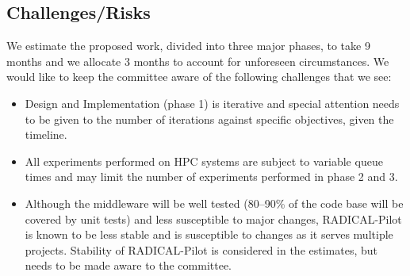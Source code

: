 \subsection{Challenges/Risks}

We estimate the proposed work, divided into three major phases, to take 9 months 
and we allocate 3 months to account for unforeseen circumstances. We would like 
to keep the committee aware of the following challenges that we see:

\begin{itemize}
	\item Design and Implementation (phase 1) is iterative and special attention needs to be given to the number of iterations against specific objectives, given the timeline.
    \item All experiments performed on HPC systems are subject to variable queue times and may limit the number of experiments performed in phase 2 and 3.
	\item Although the middleware will be well tested (80--90\% of the code base will be covered by unit tests) and less susceptible to major changes, RADICAL-Pilot is known to be less stable and is susceptible to changes as it serves multiple projects. Stability of RADICAL-Pilot is considered in the estimates, but needs to be made aware to the committee.
\end{itemize}